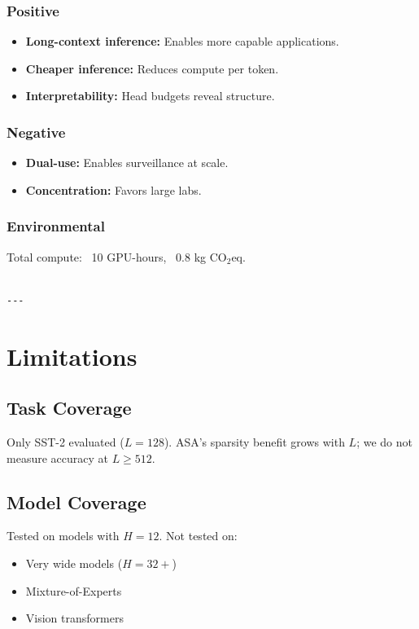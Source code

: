 \subsubsection{Positive}
\begin{itemize}
\item \textbf{Long-context inference:} Enables more capable applications.
\item \textbf{Cheaper inference:} Reduces compute per token.
\item \textbf{Interpretability:} Head budgets reveal structure.

\end{itemize}
\subsubsection{Negative}
\begin{itemize}
\item \textbf{Dual-use:} Enables surveillance at scale.
\item \textbf{Concentration:} Favors large labs.

\end{itemize}
\subsubsection{Environmental}
Total compute: ~10 GPU-hours, ~0.8 kg CO$_2$eq.
\begin{lstlisting}

---
\end{lstlisting}


\section{Limitations}

\subsection{Task Coverage}

Only SST-2 evaluated ($L = 128$). ASA's sparsity benefit grows with $L$; 
we do not measure accuracy at $L \ge 512$.

\subsection{Model Coverage}

Tested on models with $H = 12$. Not tested on:
\begin{itemize}
\item Very wide models ($H = 32+$)
\item Mixture-of-Experts
\item Vision transformers

\end{itemize}
